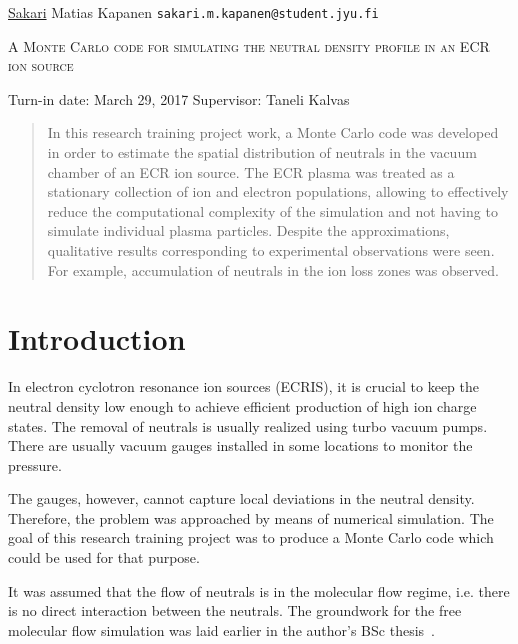 \documentclass[a4paper,twoside,12pt]{article}
\begin{document}
\thispagestyle{empty}
\begin{flushleft}
 \underline{Sakari} Matias Kapanen\hfill
 \texttt{sakari.m.kapanen@student.jyu.fi}
\end{flushleft}
\vfill
\begin{center}
\textsc{\LARGE A Monte Carlo code for simulating the neutral density profile in an ECR ion source}
\end{center}
\vfill
Turn-in date: March 29, 2017
Supervisor: Taneli Kalvas\\
\vfill
\begin{abstract}
 \noindent
    In this research training project work, a Monte Carlo code was developed in
    order to estimate the spatial distribution of neutrals in the vacuum
    chamber of an ECR ion source. The ECR plasma was treated as a stationary
    collection of ion and electron populations, allowing to effectively reduce
    the computational complexity of the simulation and not having to simulate
    individual plasma particles. Despite the approximations, qualitative
    results corresponding to experimental observations were seen. For example,
    accumulation of neutrals in the ion loss zones was observed.
\end{abstract}
\clearpage%

\setlength{\parindent}{0pt}
\setlength{\parskip}{12pt}

\setcounter{page}{1}

\section{Introduction}

In electron cyclotron resonance ion sources (ECRIS), it is crucial to keep the
neutral density low enough to achieve efficient production of high ion charge
states. The removal of neutrals is usually realized using turbo vacuum pumps.
There are usually vacuum gauges installed in some locations to monitor the pressure.

The gauges, however, cannot capture local deviations in the neutral density. Therefore, the problem was approached by means of numerical simulation. The goal of this research training project was to produce a Monte Carlo code which could be used for that purpose.

It was assumed that the flow of neutrals is in the molecular flow regime, i.e. there is no direct interaction between the neutrals. The groundwork for the free molecular flow simulation was laid earlier in the author's BSc thesis~\cite{kapanen:bsc}.
\end{document}
